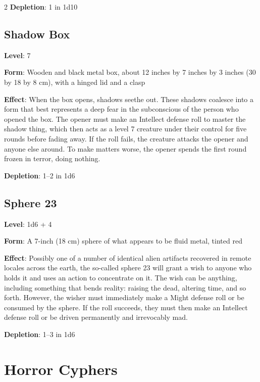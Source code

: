 \begin{multicols}{2}
\textbf{Depletion}: 1 in 1d10

\subsection{Shadow Box}

\textbf{Level}: 7

\textbf{Form}: Wooden and black metal box, about 12 inches by 7 inches by 3 inches (30 by 18 by 8 cm), with a hinged lid and a clasp

\textbf{Effect}: When the box opens, shadows seethe out. These shadows coalesce into a form that best represents a deep fear in the subconscious of the person who opened the box. The opener must make an Intellect defense roll to master the shadow thing, which then acts as a level 7 creature under their control for five rounds before fading away. If the roll fails, the creature attacks the opener and anyone else around. To make matters worse, the opener spends the first round frozen in terror, doing nothing.

\textbf{Depletion}: 1–2 in 1d6

\subsection{Sphere 23}

\textbf{Level}: 1d6 + 4

\textbf{Form}: A 7-inch (18 cm) sphere of what appears to be fluid metal, tinted red

\textbf{Effect}: Possibly one of a number of identical alien artifacts recovered in remote locales across the earth, the so-called sphere 23 will grant a wish to anyone who holds it and uses an action to concentrate on it. The wish can be anything, including something that bends reality: raising the dead, altering time, and so forth. However, the wisher must immediately make a Might defense roll or be consumed by the sphere. If the roll succeeds, they must then make an Intellect defense roll or be driven permanently and irrevocably mad.

\textbf{Depletion}: 1–3 in 1d6

\section{Horror Cyphers}


\end{multicols}
